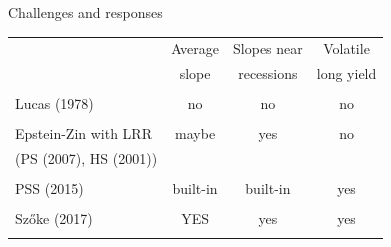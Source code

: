 \documentclass{beamer}
\theoremstyle{Definition}
\begin{document}
\begin{frame}{Challenges and responses}


\begin{table}
\begin{center}
\begin{tabular}{lccc}
& Average   & Slopes near  & Volatile\\
& slope    & recessions & long yield \\
\hline\\
Lucas (1978)  &  no & no & no \\
         &  &   \\
Epstein-Zin with LRR & maybe &   yes  &  no \\
(PS (2007), HS (2001))     & &  &  \\
&  &  & \\
PSS (2015) &  built-in  &  built-in & yes \\
         & & &  \\
Sz\H{o}ke (2017) & YES  & yes & yes \\
          & & & \\
\end{tabular}
\end{center}
\end{table}

\end{frame}
\end{document}
